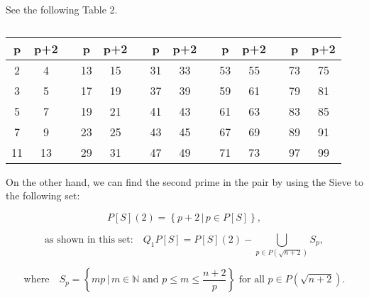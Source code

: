 \documentclass{aomart}
\begin{document}
See the following Table 2.

\begin{table}[H]
\centering
\begin{tabular}{|c|c|c|c|c|c|c|c|c|c|c|c|c|c|}
\hline
p & p+2 &   & p & p+2 &   & p & p+2 &   & p & p+2 &   & p & p+2 \\ \hline
\cellcolor{red!10} 2 & \cellcolor{red!10} 4 &  & \cellcolor{red!30} 13 & \cellcolor{red!30} 15 &  & \cellcolor{red!30} 31 & \cellcolor{red!30} 33 &  & \cellcolor{red!50} 53 & \cellcolor{red!50} 55 &  & \cellcolor{red!30} 73 & \cellcolor{red!30} 75 \\ \hline
3 & 5 &  & 17 & 19 &  & \cellcolor{red!30} 37 & \cellcolor{red!30} 39 &  & 59 & 61 &  & \cellcolor{red!30} 79 & \cellcolor{red!30} 81 \\ \hline
5 & 7 &  & \cellcolor{red!30} 19 & \cellcolor{red!30} 21 &  & 41 & 43 &  & \cellcolor{red!30} 61 & \cellcolor{red!30} 63 &  & \cellcolor{red!50} 83 & \cellcolor{red!50} 85 \\ \hline
\cellcolor{red!30} 7 & \cellcolor{red!30} 9 &  & \cellcolor{red!50} 23 & \cellcolor{red!50} 25 &  & \cellcolor{red!30} 43 & \cellcolor{red!30} 45 &  & \cellcolor{red!30} 67 & \cellcolor{red!30} 69 &  & \cellcolor{red!70} 89 & \cellcolor{red!70} 91 \\ \hline
11 & 13 &   & 29 & 31 &   & \cellcolor{red!70} 47 & \cellcolor{red!70} 49 &   & 71 & 73 &   & \cellcolor{red!30} 97 & \cellcolor{red!30} 99 \\ \hline
\end{tabular}
\caption{}
\end{table}



\vspace{1\baselineskip}

On the other hand, we can find the second prime in the pair by using the Sieve to the following set: 

\begin{equation}
P[S](2) = \left\{ p+2 \, | \, p \in P[S] \right\},
\end{equation}

\begin{equation}
\text{as shown in this set:} \quad Q_{1}P[S] = P[S](2) - \bigcup_{p \in P(\sqrt{n+2})} S_{p},
\end{equation}

\begin{equation}
\text{where} \quad S_{p} = \left\{ mp \, | \, m \in \mathbb{N} \text{ and } p \leq m \leq \frac{n+2}{p} \right\} \text{ for all } p \in P(\sqrt{n+2}).
\end{equation}
\end{document}

